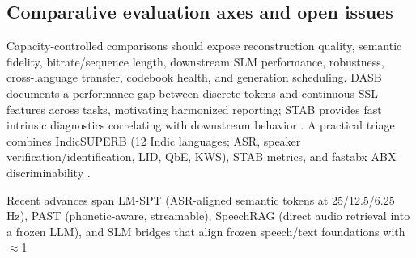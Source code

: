 \documentclass{article}
\begin{document}
\subsection{Comparative evaluation axes and open issues} \label{subsec:Comparative evaluation axes and open issues}
Capacity-controlled comparisons should expose reconstruction quality, semantic fidelity, bitrate/sequence length, downstream SLM performance, robustness, cross-language transfer, codebook health, and generation scheduling. DASB documents a performance gap between discrete tokens and continuous SSL features across tasks, motivating harmonized reporting; STAB provides fast intrinsic diagnostics correlating with downstream behavior \cite{mousavi2024dasbdiscreteaudiospeechbenchmark,vashishth2024stabspeechtokenizerassessmentbenchmark}. A practical triage combines IndicSUPERB (12 Indic languages; ASR, speaker verification/identification, LID, QbE, KWS), STAB metrics, and fastabx ABX discriminability \cite{vashishth2024stabspeechtokenizerassessmentbenchmark,poli2025fastabxlibraryefficientcomputationabxdis,entry2025indicsuperbspeechprocessinguniversalperf}.

Recent advances span LM-SPT (ASR-aligned semantic tokens at 25/12.5/6.25 Hz), PAST (phonetic-aware, streamable), SpeechRAG (direct audio retrieval into a frozen LLM), and SLM bridges that align frozen speech/text foundations with $\approx$1%
\end{document}
